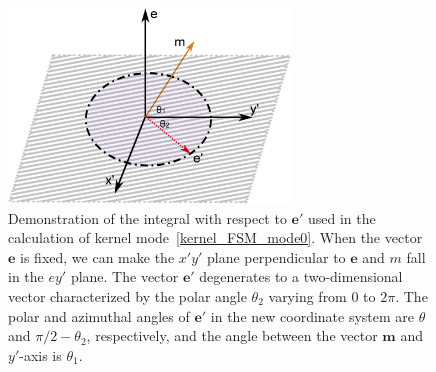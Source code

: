 \begin{figure}[t]
	\centering
	\includegraphics[width=7.5cm]{Chapter4/IMG/demo.pdf}
	\caption{
		Demonstration of the integral with respect to $\bm{e}'$ used in the calculation of kernel mode~\eqref{kernel_FSM_mode0}. When the vector $\bm{e}$ is fixed, we can make the $x'y'$ plane perpendicular to $\bm{e}$ and $m$ fall in the $ey'$ plane. The vector $\bm{e}'$ degenerates to a two-dimensional vector characterized by the polar angle $\theta_2$ varying from 0 to $2\pi$. The polar and azimuthal angles of $\bm{e}'$ in the new coordinate system are $\theta$ and $\pi/2-\theta_2$, respectively, and the angle between the vector $\bm{m}$ and $y'$-axis is $\theta_1$. 
	} 
	\label{demo}
\end{figure}


